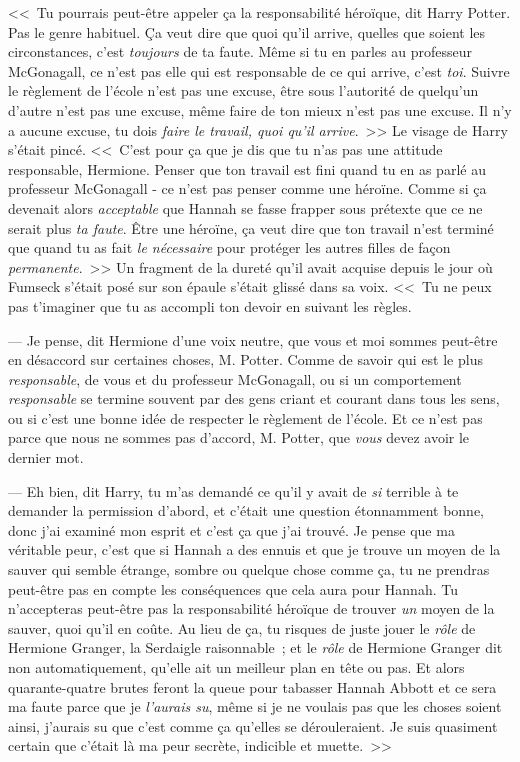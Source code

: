 <<~Tu pourrais peut-être appeler ça la responsabilité héroïque, dit Harry Potter. Pas le genre habituel. Ça veut dire que quoi qu'il arrive, quelles que soient les circonstances, c'est \emph{toujours} de ta faute. Même si tu en parles au professeur McGonagall, ce n'est pas elle qui est responsable de ce qui arrive, c'est \emph{toi}. Suivre le règlement de l'école n'est pas une excuse, être sous l'autorité de quelqu'un d'autre n'est pas une excuse, même faire de ton mieux n'est pas une excuse. Il n'y a aucune excuse, tu dois \emph{faire le travail, quoi qu'il arrive}.~>> Le visage de Harry s'était pincé. <<~C'est pour ça que je dis que tu n'as pas une attitude responsable, Hermione. Penser que ton travail est fini quand tu en as parlé au professeur McGonagall - ce n'est pas penser comme une héroïne. Comme si ça devenait alors \emph{acceptable} que Hannah se fasse frapper sous prétexte que ce ne serait plus \emph{ta faute}. Être une héroïne, ça veut dire que ton travail n'est terminé que quand tu as fait \emph{le nécessaire} pour protéger les autres filles de façon \emph{permanente}.~>> Un fragment de la dureté qu'il avait acquise depuis le jour où Fumseck s'était posé sur son épaule s'était glissé dans sa voix. <<~Tu ne peux pas t'imaginer que tu as accompli ton devoir en suivant les règles.

--- Je pense, dit Hermione d'une voix neutre, que vous et moi sommes peut-être en désaccord sur certaines choses, M. Potter. Comme de savoir qui est le plus \emph{responsable}, de vous et du professeur McGonagall, ou si un comportement \emph{responsable} se termine souvent par des gens criant et courant dans tous les sens, ou si c'est une bonne idée de respecter le règlement de l'école. Et ce n'est pas parce que nous ne sommes pas d'accord, M. Potter, que \emph{vous} devez avoir le dernier mot.

--- Eh bien, dit Harry, tu m'as demandé ce qu'il y avait de \emph{si} terrible à te demander la permission d'abord, et c'était une question étonnamment bonne, donc j'ai examiné mon esprit et c'est ça que j'ai trouvé. Je pense que ma véritable peur, c'est que si Hannah a des ennuis et que je trouve un moyen de la sauver qui semble étrange, sombre ou quelque chose comme ça, tu ne prendras peut-être pas en compte les conséquences que cela aura pour Hannah. Tu n'accepteras peut-être pas la responsabilité héroïque de trouver \emph{un} moyen de la sauver, quoi qu'il en coûte. Au lieu de ça, tu risques de juste jouer le \emph{rôle} de Hermione Granger, la Serdaigle raisonnable~; et le \emph{rôle} de Hermione Granger dit non automatiquement, qu'elle ait un meilleur plan en tête ou pas. Et alors quarante-quatre brutes feront la queue pour tabasser Hannah Abbott et ce sera ma faute parce que je \emph{l'aurais su}, même si je ne voulais pas que les choses soient ainsi, j'aurais su que c'est comme ça qu'elles se dérouleraient. Je suis quasiment certain que c'était là ma peur secrète, indicible et muette.~>>

